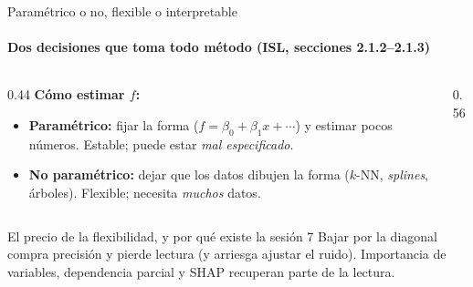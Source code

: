 \documentclass{beamer}
\newcommand{\1}{\mathbb{I}}
\begin{document}
\begin{frame}{Paramétrico o no, flexible o interpretable}
\framesubtitle{Dos decisiones que toma todo método (ISL, secciones 2.1.2--2.1.3)}
\small
\begin{columns}[T]
\begin{column}{0.44\textwidth}
\textbf{Cómo estimar $f$:}
\begin{itemize}\itemsep2pt
  \item \textbf{Paramétrico:} fijar la forma ($f = \beta_0 + \beta_1 x + \cdots$) y estimar pocos números. Estable; puede estar \emph{mal especificado}.
  \item \textbf{No paramétrico:} dejar que los datos dibujen la forma ($k$-NN, \emph{splines}, árboles). Flexible; necesita \emph{muchos} datos.
\end{itemize}
\end{column}
\begin{column}{0.56\textwidth}
\begin{center}
\end{center}
\end{column}
\end{columns}
\pause
\vspace{0.1cm}
\begin{block}{El precio de la flexibilidad, y por qué existe la sesión 7}
Bajar por la diagonal compra precisión y pierde lectura (y arriesga ajustar el ruido). Importancia de variables, dependencia parcial y SHAP recuperan parte de la lectura.
\end{block}
\end{frame}
\end{document}
